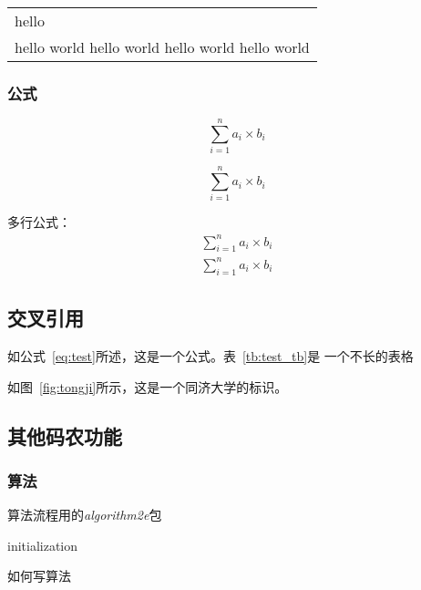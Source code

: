 			\begin{tabular}{p{5cm}}
			hello \\ 
			hello world hello world hello world hello world \\ \hline
			\end{tabular}
	
\subsubsection{公式}
	\begin{equation}\label{eq:test}
	\sum_{i=1}^n a_i \times b_i 
	\end{equation}
	
	\begin{equation}
		\sum_{i=1}^n a_i \times b_i 
		\end{equation}
		
	多行公式：
	\begin{eqnarray}
			\sum_{i=1}^n a_i \times b_i  \nonumber \\
				\sum_{i=1}^n a_i \times b_i 
	\end{eqnarray}
\subsection{交叉引用}
	如公式~\ref{eq:test}所述，这是一个公式。表~\ref{tb:test_tb}是
	一个不长的表格
	
	如图~\ref{fig:tongji}所示，这是一个同济大学的标识。
	
\subsection{其他码农功能}
\subsubsection{算法}
算法流程用的\textit{algorithm2e}包
\begin{algorithm}
	 initialization\;
	 \caption{如何写算法}
\end{algorithm}

